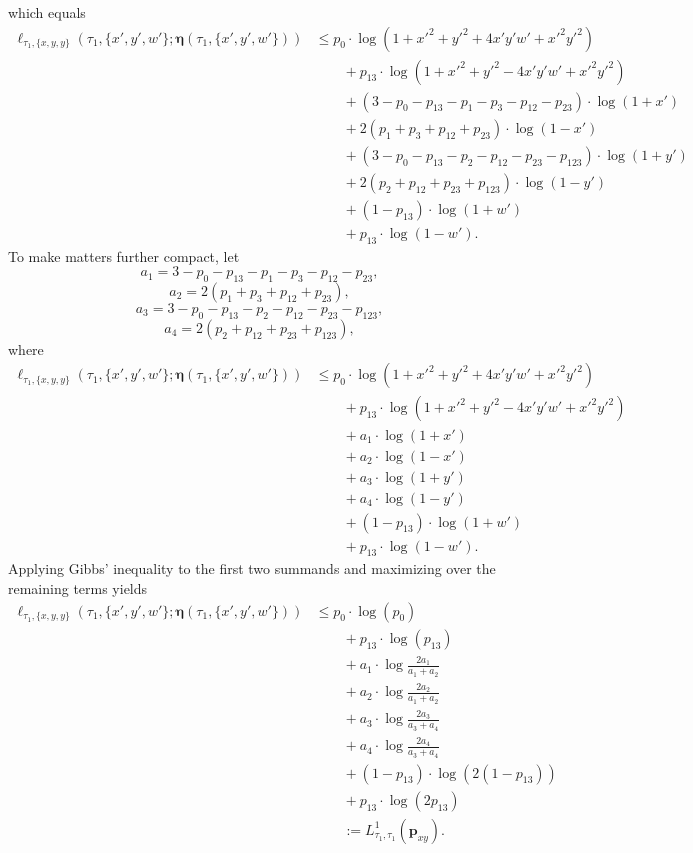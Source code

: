 \documentclass{article}
\newcommand{\fullAncestralSplitPartitions}{\boldsymbol\eta}
\begin{document}
which equals
\begin{align*}
    \ell_{\tau_1,\{x,y,y\}}(\tau_1, \{x',y',w'\}; \fullAncestralSplitPartitions(\tau_1,\{x',y',w'\}))
    &\le      p_{0}  \cdot\log(1+x'^2+y'^2+4x'y'w'+x'^2y'^2) \\
    &\qquad + p_{13} \cdot\log(1+x'^2+y'^2-4x'y'w'+x'^2y'^2) \\
    &\qquad + (3-p_{0}-p_{13}-p_{1}-p_{3}-p_{12}-p_{23})\cdot\log(1+x') \\
    &\qquad + 2(p_{1}+p_{3}+p_{12}+p_{23})\cdot\log(1-x') \\
    &\qquad + (3-p_{0}-p_{13}-p_{2}-p_{12}-p_{23}-p_{123})\cdot\log(1+y') \\
    &\qquad + 2(p_{2}+p_{12}+p_{23}+p_{123})\cdot\log(1-y') \\
    &\qquad + (1-p_{13})\cdot\log(1+w') \\
    &\qquad + p_{13}\cdot\log(1-w').
\end{align*}
To make matters further compact, let
$$
a_{1} = 3-p_{0}-p_{13}-p_{1}-p_{3}-p_{12}-p_{23},
$$
$$
a_{2} = 2(p_{1}+p_{3}+p_{12}+p_{23}),
$$
$$
a_{3} = 3-p_{0}-p_{13}-p_{2}-p_{12}-p_{23}-p_{123},
$$
$$
a_{4} = 2(p_{2}+p_{12}+p_{23}+p_{123}),
$$
where
\begin{align*}
    \ell_{\tau_1,\{x,y,y\}}(\tau_1, \{x',y',w'\}; \fullAncestralSplitPartitions(\tau_1,\{x',y',w'\}))
    &\le      p_{0}  \cdot\log(1+x'^2+y'^2+4x'y'w'+x'^2y'^2) \\
    &\qquad + p_{13} \cdot\log(1+x'^2+y'^2-4x'y'w'+x'^2y'^2) \\
    &\qquad + a_{1}\cdot\log(1+x') \\
    &\qquad + a_{2}\cdot\log(1-x') \\
    &\qquad + a_{3}\cdot\log(1+y') \\
    &\qquad + a_{4}\cdot\log(1-y') \\
    &\qquad + (1-p_{13})\cdot\log(1+w') \\
    &\qquad + p_{13}\cdot\log(1-w').
\end{align*}
Applying Gibbs' inequality to the first two summands and maximizing over the remaining terms yields
\begin{align*}
    \ell_{\tau_1,\{x,y,y\}}(\tau_1, \{x',y',w'\}; \fullAncestralSplitPartitions(\tau_1,\{x',y',w'\}))
    &\le      p_{0}  \cdot\log(p_{0}) \\
    &\qquad + p_{13} \cdot\log(p_{13}) \\
    &\qquad + a_{1}\cdot\log\frac{2a_{1}}{a_{1}+a_{2}} \\
    &\qquad + a_{2}\cdot\log\frac{2a_{2}}{a_{1}+a_{2}} \\
    &\qquad + a_{3}\cdot\log\frac{2a_{3}}{a_{3}+a_{4}} \\
    &\qquad + a_{4}\cdot\log\frac{2a_{4}}{a_{3}+a_{4}} \\
    &\qquad + (1-p_{13})\cdot\log(2(1-p_{13})) \\
    &\qquad + p_{13}\cdot\log(2p_{13}) \\
    &\qquad := L^{1}_{\tau_1,\tau_1}(\mathbf{p}_{xy}).
\end{align*}
\end{document}
